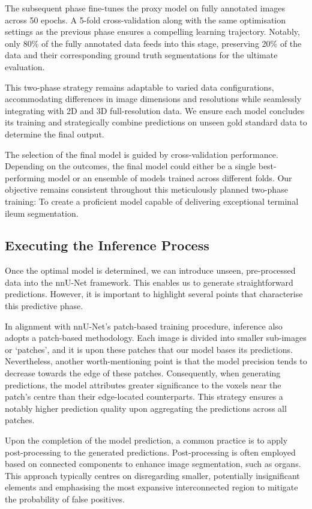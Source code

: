 The subsequent phase fine-tunes the proxy model on fully annotated images across 50 epochs. A 5-fold cross-validation along with the same optimisation settings as the previous phase ensures a compelling learning trajectory. Notably, only 80\% of the fully annotated data feeds into this stage, preserving 20\% of the data and their corresponding ground truth segmentations for the ultimate evaluation.

This two-phase strategy remains adaptable to varied data configurations, accommodating differences in image dimensions and resolutions while seamlessly integrating with 2D and 3D full-resolution data. We ensure each model concludes its training and strategically combine predictions on unseen gold standard data to determine the final output.

The selection of the final model is guided by cross-validation performance. Depending on the outcomes, the final model could either be a single best-performing model or an ensemble of models trained across different folds. Our objective remains consistent throughout this meticulously planned two-phase training: To create a proficient model capable of delivering exceptional terminal ileum segmentation.

\subsection{Executing the Inference Process}

Once the optimal model is determined, we can introduce unseen, pre-processed data into the nnU-Net framework. This enables us to generate straightforward predictions. However, it is important to highlight several points that characterise this predictive phase.

In alignment with nnU-Net's patch-based training procedure, inference also adopts a patch-based methodology. Each image is divided into smaller sub-images or `patches', and it is upon these patches that our model bases its predictions. Nevertheless, another worth-mentioning point is that the model precision tends to decrease towards the edge of these patches. Consequently, when generating predictions, the model attributes greater significance to the voxels near the patch's centre than their edge-located counterparts. This strategy ensures a notably higher prediction quality upon aggregating the predictions across all patches.

Upon the completion of the model prediction, a common practice is to apply post-processing to the generated predictions. Post-processing is often employed based on connected components to enhance image segmentation, such as organs. This approach typically centres on disregarding smaller, potentially insignificant elements and emphasising the most expansive interconnected region to mitigate the probability of false positives.

